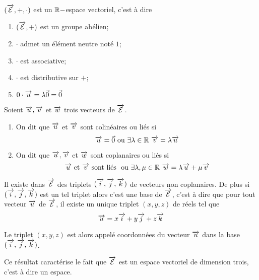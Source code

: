 \begin{prop}
  \((\overrightarrow{\mathcal{E}}, +, \cdot)\) est un \(\mathbb{R}-\)espace vectoriel, c'est à dire
  \begin{enumerate}
  \item \((\overrightarrow{\mathcal{E}}, +)\) est un groupe abélien;
  \item \(\cdot\) admet un élément neutre noté \(1\);
  \item \(\cdot\) est associative;
  \item \(\cdot\) est distributive sur \(+\);
  \item \(0 \cdot \overrightarrow{u} = \lambda \vec{0} = \vec{0}\)
  \end{enumerate}
\end{prop}
\begin{defdef}
  Soient \(\overrightarrow{u}, \overrightarrow{v}\) et \(\overrightarrow{w}\) trois vecteurs de \(\overrightarrow{\mathcal{E}}\).
  \begin{enumerate}
  \item On dit que \(\overrightarrow{u}\) et \(\overrightarrow{v}\) sont colinéaires ou liés si
    \begin{equation}
      \overrightarrow{u} = \vec{0} \text{ ou } \exists \lambda \in \mathbb{R} \ \overrightarrow{v} = \lambda \overrightarrow{u}
    \end{equation}
  \item On dit que \(\overrightarrow{u}, \overrightarrow{v}\) et \(\overrightarrow{w}\) sont coplanaires ou liés si
    \begin{equation}
      \overrightarrow{u} \text{ et } \overrightarrow{v} \text{ sont liés } \text{ ou } \exists \lambda, \mu \in \mathbb{R} \ \overrightarrow{w} = \lambda \overrightarrow{u} + \mu \overrightarrow{v}
    \end{equation}
  \end{enumerate}
\end{defdef}
\begin{prop}
  Il existe dans \(\overrightarrow{\mathcal{E}}\) des triplets \((\overrightarrow{i},\overrightarrow{j},\overrightarrow{k})\) de vecteurs non coplanaires. De plus si \((\overrightarrow{i},\overrightarrow{j},\overrightarrow{k})\) est un tel triplet alors c'est une base de \(\overrightarrow{\mathcal{E}}\), c'est à dire que pour tout vecteur \(\overrightarrow{u}\) de \(\overrightarrow{\mathcal{E}}\), il existe un unique triplet \((x,y,z)\) de réels tel que
  \begin{equation}
    \overrightarrow{u} = x\overrightarrow{i} + y\overrightarrow{j} + z\overrightarrow{k}
  \end{equation}
\end{prop}
\begin{defdef}
  Le triplet \((x,y,z)\) est alors appelé coordonnées du vecteur \(\overrightarrow{u}\) dans la base \((\overrightarrow{i},\overrightarrow{j},\overrightarrow{k})\).
\end{defdef}

Ce résultat caractérise le fait que \(\overrightarrow{\mathcal{E}}\) est un espace vectoriel de dimension trois, c'est à dire un espace.

